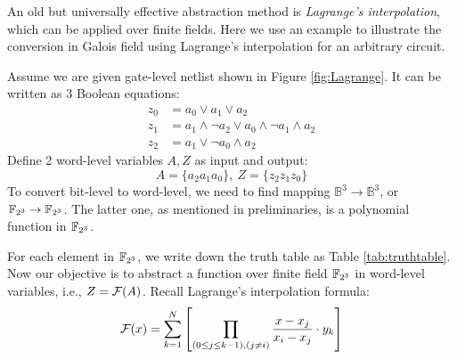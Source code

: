 An old but universally effective abstraction method is {\it Lagrange's interpolation}, 
which can be applied over finite fields. Here we use an example to illustrate the 
conversion in Galois field using Lagrange's interpolation for an arbitrary circuit.

\begin{Example}
Assume we are given gate-level netlist shown in Figure \ref{fig:Lagrange}. It can be written as 3 
Boolean equations:
\begin{align*}
z_0 &= a_0 \lor a_1 \lor a_2 \\
z_1 &= a_1 \land \neg a_2 \lor a_0 \land \neg a_1 \land a_2 \\
z_2 &= a_1 \lor \neg a_0 \land a_2
\end{align*}
Define 2 word-level variables $A,Z$ as input and output:
$$A = \{a_2a_1a_0\},~Z = \{z_2z_1z_0\}$$
To convert bit-level to word-level, we need to find mapping $\mathbb{B}^3 \rightarrow \mathbb{B}^3$,
or ${\mathbb{F}}_{2^3} \rightarrow {\mathbb{F}}_{2^3}$. The latter one, as mentioned in preliminaries, is a polynomial
function in ${\mathbb{F}}_{2^3}$.

\begin{figure}[tbp]
\end{figure}

For each element in ${\mathbb{F}}_{2^3}$, we write down the truth table as Table \ref{tab:truthtable}.
Now our objective is to abstract a function over finite field ${\mathbb{F}}_{2^3}$ in word-level variables, i.e., 
$Z = {\mathcal{F}}(A)$. Recall Lagrange's interpolation formula:
\begin{equation}
\label{eqn:Lagrange}
{\mathcal{F}}(x) =  \sum_{k=1}^N \left[ \prod_{(0\leq j \leq k-1),(j\neq i)}\frac{x-x_j}{x_i-x_j} \cdot y_k \right]
\end{equation}


\end{Example}

